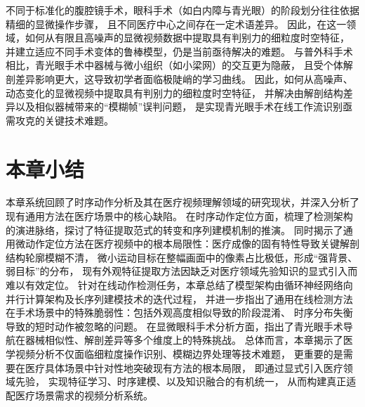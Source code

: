 不同于标准化的腹腔镜手术，眼科手术（如白内障与青光眼）的阶段划分往往依据精细的显微操作步骤，
且不同医疗中心之间存在一定术语差异。
因此，在这一领域，如何从有限且高噪声的显微视频数据中提取具有判别力的细粒度时空特征，
并建立适应不同手术变体的鲁棒模型，仍是当前亟待解决的难题。
与普外科手术相比，青光眼手术中器械与微小组织（如小梁网）的交互更为隐蔽，
且受个体解剖差异影响更大，这导致初学者面临极陡峭的学习曲线。
因此，如何从高噪声、动态变化的显微视频中提取具有判别力的细粒度时空特征，
并解决由解剖结构差异以及相似器械带来的“模糊帧”误判问题，
是实现青光眼手术在线工作流识别亟需攻克的关键技术难题。


\section{本章小结}
本章系统回顾了时序动作分析及其在医疗视频理解领域的研究现状，并深入分析了现有通用方法在医疗场景中的核心缺陷。
在时序动作定位方面，梳理了检测架构的演进脉络，探讨了特征提取范式的转变和序列建模机制的推演。
同时揭示了通用微动作定位方法在医疗视频中的根本局限性：医疗成像的固有特性导致关键解剖结构轮廓模糊不清，
微小运动目标在整幅画面中的像素占比极低，形成``强背景、弱目标''的分布，
现有外观特征提取方法因缺乏对医疗领域先验知识的显式引入而难以有效定位。
针对在线动作检测任务，本章总结了模型架构由循环神经网络向并行计算架构及长序列建模技术的迭代过程，
并进一步指出了通用在线检测方法在手术场景中的特殊脆弱性：包括外观高度相似导致的阶段混淆、
时序分布失衡导致的短时动作被忽略的问题。
在显微眼科手术分析方面，指出了青光眼手术导航在器械相似性、解剖差异等多个维度上的特殊挑战。
总体而言，本章揭示了医学视频分析不仅面临细粒度操作识别、模糊边界处理等技术难题，
更重要的是需要在医疗具体场景中针对性地突破现有方法的根本局限，
即通过显式引入医疗领域先验，
实现特征学习、时序建模、以及知识融合的有机统一，
从而构建真正适配医疗场景需求的视频分析系统。